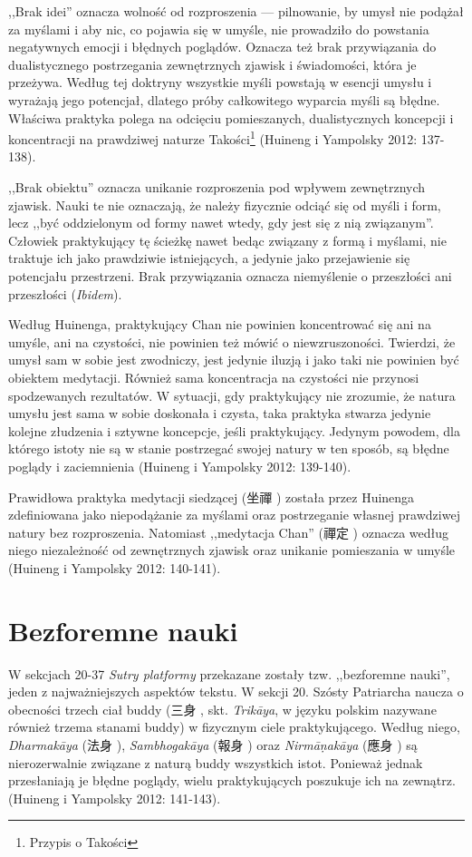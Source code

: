 ,,Brak idei'' oznacza wolność od rozproszenia --- pilnowanie, by umysł nie podążał za myślami i aby nic, co pojawia się w umyśle, nie prowadziło do powstania negatywnych emocji i błędnych poglądów. Oznacza też brak przywiązania do dualistycznego postrzegania zewnętrznych zjawisk i świadomości, która je przeżywa. Według tej doktryny wszystkie myśli powstają w esencji umysłu i wyrażają jego potencjał, dlatego próby całkowitego wyparcia myśli są błędne. Właściwa praktyka polega na odcięciu pomieszanych, dualistycznych koncepcji i koncentracji na prawdziwej naturze Takości\footnote{Przypis o Takości} (Huineng i Yampolsky 2012: 137-138).

,,Brak obiektu'' oznacza unikanie rozproszenia pod wpływem zewnętrznych zjawisk. Nauki te nie oznaczają, że należy fizycznie odciąć się od myśli i form, lecz ,,być oddzielonym od formy nawet wtedy, gdy jest się z nią związanym''. Człowiek praktykujący tę ścieżkę nawet bedąc związany z formą i myślami, nie traktuje ich jako prawdziwie istniejących, a jedynie jako przejawienie się potencjału przestrzeni. Brak przywiązania oznacza niemyślenie o przeszłości ani przeszłości (\textit{Ibidem}).

Według Huinenga, praktykujący Chan nie powinien koncentrować się ani na umyśle, ani na czystości, nie powinien też mówić o niewzruszoności. Twierdzi, że umysł sam w sobie jest zwodniczy, jest jedynie iluzją i jako taki nie powinien być obiektem medytacji. Również sama koncentracja na czystości nie przynosi spodzewanych rezultatów. W sytuacji, gdy praktykujący nie zrozumie, że natura umysłu jest sama w sobie doskonała i czysta, taka praktyka stwarza jedynie kolejne złudzenia i sztywne koncepcje, jeśli praktykujący. Jedynym powodem, dla którego istoty nie są w stanie postrzegać swojej natury w ten sposób, są błędne poglądy i zaciemnienia (Huineng i Yampolsky 2012: 139-140).

Prawidłowa praktyka medytacji siedzącej (坐禪 ) została przez Huinenga zdefiniowana jako niepodążanie za myślami oraz postrzeganie własnej prawdziwej natury bez rozproszenia. Natomiast ,,medytacja Chan'' (禪定 ) oznacza według niego niezależność od zewnętrznych zjawisk oraz unikanie pomieszania w umyśle (Huineng i Yampolsky 2012: 140-141).

\section{Bezforemne nauki}
W sekcjach 20-37 \textit{Sutry platformy} przekazane zostały tzw. ,,bezforemne nauki'', jeden z najważniejszych aspektów tekstu. W sekcji 20. Szósty Patriarcha naucza o obecności trzech ciał buddy (三身 , skt. \textit{Trikāya}, w języku polskim nazywane również trzema stanami buddy) w fizycznym ciele praktykującego. Według niego, \textit{Dharmakāya} (法身 ), \textit{Sambhogakāya} (報身 ) oraz \textit{Nirmā\d{n}akāya} (應身 ) są nierozerwalnie związane z naturą buddy wszystkich istot. Ponieważ jednak przesłaniają je błędne poglądy, wielu praktykujących poszukuje ich na zewnątrz.
(Huineng i Yampolsky 2012: 141-143).

